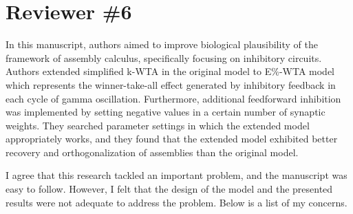 \documentclass[a4paper, 11pt]{article}
\begin{document}
\section*{Reviewer \#6}

In this manuscript, authors aimed to improve biological plausibility of the framework of assembly calculus, specifically focusing on inhibitory circuits. Authors extended simplified k-WTA in the original model to E\%-WTA model which represents the winner-take-all effect generated by inhibitory feedback in each cycle of gamma oscillation. Furthermore, additional feedforward inhibition was implemented by setting negative values in a certain number of synaptic weights. They searched parameter settings in which the extended model appropriately works, and they found that the extended model exhibited better recovery and orthogonalization of assemblies than the original model.

I agree that this research tackled an important problem, and the manuscript was easy to follow. However, I felt that the design of the model and the presented results were not adequate to address the problem. Below is a list of my concerns.
\end{document}

